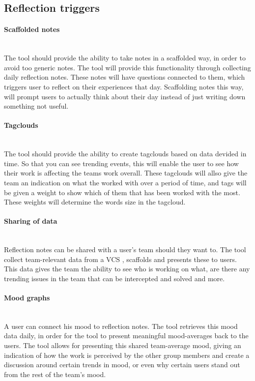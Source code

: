\subsection{Reflection triggers}
\paragraph{Scaffolded notes}\mbox{}\\
The tool should provide the ability to take notes in a scaffolded way, in order to avoid too generic notes. The tool will provide this functionality through collecting daily reflection notes. These notes will have questions connected to them, which triggers user to reflect on their experiences that day. Scaffolding notes this way, will prompt users to actually think about their day instead of just writing down something not useful. 
\paragraph{Tagclouds}\mbox{}\\
The tool should provide the ability to create tagclouds based on data devided in time. So that you can see trending events, this will enable the user to see how their work is affecting the teams work overall. These tagclouds will allso give the team an indication on what the worked with over a period of time, and tags will be given a weight to show which of them that has been worked with the most. These weights will determine the words size in the tagcloud. 
\paragraph{Sharing of data}\mbox{}\\
Reflection notes can be shared with a user's team should they want to. The tool collect team-relevant data from a VCS , scaffolds and presents these to users. This data gives the team the ability to see who is working on what, are there any trending issues in the team that can be intercepted and solved and more.  
\paragraph{Mood graphs}\mbox{}\\
A user can connect his mood to reflection notes. The tool retrieves this mood data daily, in order for the tool to present meaningful mood-averages back to the users. 
The tool allows for presenting this shared team-average mood, giving an indication of how the work is perceived by the other group members and create a discussion around certain trends in mood, or even why certain users stand out from the rest of the team's mood. 
